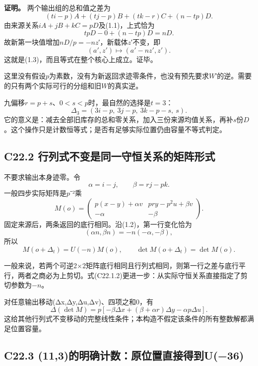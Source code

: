\textbf{{证明。}} {两个输出组的总和值之差为} \[
(ti-p)A+(tj-p)B+(tk-r)C+(n-tp)D.
\] {由来源关系\ensuremath{iA+jB+kC=pD}及(1.1)，上式恰为} \[
tpD-0+(n-tp)D=nD.
\] {故新第一块值增加\ensuremath{nD/p=-nz}′，新载体\ensuremath{z}′不变，即} \[
(a',z')\longmapsto(a'-nz',z').
\] {这就是(1.3)，而且等式在整个核心上成立。证毕。}

{这里没有假设\ensuremath{p}为素数，没有为新返回求迹零条件，也没有预先要求\ensuremath{W}′的逆。需要的只有两个实际可行的分组和旧\ensuremath{W}的真实逆。}

{九偏移\ensuremath{r=p+s}、\ensuremath{0<s<p}时，最自然的选择是\ensuremath{t=3}：} \[
\boxed{\Delta_3=(3i-p,\ 3j-p,\ 3k-p-s,\ s).}
\tag{C22.1.4}
\] {它的意义是：减去全部旧库存的总和零关系，加入三份来源均值关系，再补\ensuremath{s}份\ensuremath{D}。这个操作只是计数恒等式；是否有足够实际位置仍由容量不等式判定。}

\subsection*{\texorpdfstring{{C22.2} {行列式不变是同一守恒关系的矩阵形式}}{C22.2 行列式不变是同一守恒关系的矩阵形式}}\label{C22-h147}

{不要求输出本身迹零。令} \[
\alpha=i-j,\qquad\beta=rj-pk.
\] {一般四步实际矩阵是\ensuremath{p}⁻²乘} \[
M(o)=
\begin{pmatrix}
p(x-y)+\alpha v & pry-p^2u+\beta v\\
-\alpha&-\beta
\end{pmatrix}.
\tag{C22.2.1}
\] {固定来源后，两条返回的底行相同。沿(1.2)，第一行变化恰为} \[
(\alpha n,\beta n)=-n(-\alpha,-\beta),
\] {所以} \[
M(o+\Delta_t)=U(-n)M(o),\qquad
\det M(o+\Delta_t)=\det M(o).
\tag{C22.2.2}
\]

{一般来说，若两个可逆2×2矩阵底行相同且行列式相同，则第一行之差与底行平行，两者之商必为上剪切。式(C22.1.2)更进一步：从实际守恒关系直接指定了剪切参数为−\ensuremath{n}。}

{对任意输出移动(Δx,Δy,Δu,Δv)、四项之和0，有} \[
\Delta(\det M)
=p[-\beta\Delta x+(\beta+\alpha r)\Delta y-\alpha p\Delta u].
\tag{C22.2.3}
\] {这给其他行列式不变移动的完整线性条件；本构造不假定该条件的所有整数解都满足位置容量。}

\subsection*{\texorpdfstring{{C22.3} {(11,3)的明确计数：原位置直接得到U(−36)}}{C22.3 (11,3)的明确计数：原位置直接得到U(−36)}}\label{C22-h148}

